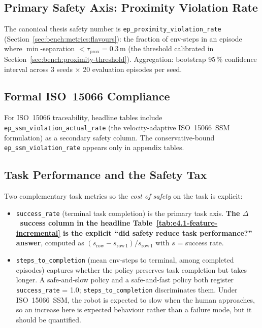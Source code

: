 \documentclass[11pt,a4paper]{report}
\newcommand{\ssm}{SSM}
\newcommand{\iso}{ISO~15066}
\begin{document}
\subsection{Primary Safety Axis: Proximity Violation Rate}
\label{sec:setup:metrics:primary}

The canonical thesis safety number is
\texttt{ep\_proximity\_violation\_rate}
(Section~\ref{sec:bench:metrics:flavours}): the fraction of
env-steps in an episode where $\min$-separation $<
\tau_{\mathrm{prox}} = 0.3$\,m (the threshold calibrated in
Section~\ref{sec:bench:proximity-threshold}). Aggregation: bootstrap 95\,\%
confidence interval across 3 seeds $\times$ 20 evaluation episodes
per seed.

\subsection{Formal \iso{} Compliance}
\label{sec:setup:metrics:iso}

For \iso{} traceability, headline tables include
\texttt{ep\_ssm\_violation\_actual\_rate} (the velocity-adaptive
\iso{}~\ssm{} formulation) as a secondary safety column. The
conservative-bound \texttt{ep\_ssm\_violation\_rate} appears only
in appendix tables.

\subsection{Task Performance and the Safety Tax}
\label{sec:setup:metrics:task}

Two complementary task metrics so the \emph{cost of safety} on the
task is explicit:

\begin{itemize}[topsep=2pt,itemsep=1pt]
\item \texttt{success\_rate} (terminal task completion) is the
  primary task axis. \textbf{The $\Delta$~success column in the
  headline Table~\ref{tab:e4.1-feature-incremental} is the explicit
  ``did safety reduce task performance?'' answer}, computed as
  $(s_{\mathrm{row}} - s_{\mathrm{row\,1}})/s_{\mathrm{row\,1}}$
  with $s$ = success rate.
\item \texttt{steps\_to\_completion} (mean env-steps to terminal,
  among completed episodes) captures whether the policy preserves
  task completion but takes longer. A safe-and-slow policy and a
  safe-and-fast policy both register \texttt{success\_rate} = 1.0;
  \texttt{steps\_to\_completion} discriminates them. Under
  \iso{}~\ssm{}, the robot is expected to slow when the human
  approaches, so an increase here is expected behaviour rather than
  a failure mode, but it should be quantified.
\end{itemize}
\end{document}
